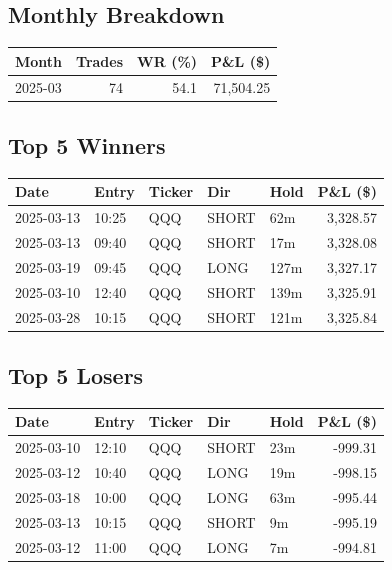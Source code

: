 \documentclass[11pt,a4paper,twoside]{article}
\begin{document}
\subsection{Monthly Breakdown}
\noindent\begin{center}
\begin{tabular}{>{\color{txtmain}}l rrr}
\toprule
\rowcolor{cardbg}
\textbf{Month} & \textbf{Trades} & \textbf{WR (\%)} & \textbf{P\&L (\$)} \\
\midrule
2025-03 & 74 & 54.1 & \textcolor{wingreen}{71,504.25} \\
\bottomrule
\end{tabular}
\end{center}
\subsection{Top 5 Winners}
\noindent\begin{center}
\begin{tabular}{>{\color{txtmain}}l llll r}
\toprule
\rowcolor{cardbg}
\textbf{Date} & \textbf{Entry} & \textbf{Ticker} & \textbf{Dir} & \textbf{Hold} & \textbf{P\&L (\$)} \\
\midrule
2025-03-13 & 10:25 & QQQ & SHORT & 62m & \textcolor{wingreen}{3,328.57} \\
2025-03-13 & 09:40 & QQQ & SHORT & 17m & \textcolor{wingreen}{3,328.08} \\
2025-03-19 & 09:45 & QQQ & LONG & 127m & \textcolor{wingreen}{3,327.17} \\
2025-03-10 & 12:40 & QQQ & SHORT & 139m & \textcolor{wingreen}{3,325.91} \\
2025-03-28 & 10:15 & QQQ & SHORT & 121m & \textcolor{wingreen}{3,325.84} \\
\bottomrule
\end{tabular}
\end{center}
\subsection{Top 5 Losers}
\noindent\begin{center}
\begin{tabular}{>{\color{txtmain}}l llll r}
\toprule
\rowcolor{cardbg}
\textbf{Date} & \textbf{Entry} & \textbf{Ticker} & \textbf{Dir} & \textbf{Hold} & \textbf{P\&L (\$)} \\
\midrule
2025-03-10 & 12:10 & QQQ & SHORT & 23m & \textcolor{lossred}{-999.31} \\
2025-03-12 & 10:40 & QQQ & LONG & 19m & \textcolor{lossred}{-998.15} \\
2025-03-18 & 10:00 & QQQ & LONG & 63m & \textcolor{lossred}{-995.44} \\
2025-03-13 & 10:15 & QQQ & SHORT & 9m & \textcolor{lossred}{-995.19} \\
2025-03-12 & 11:00 & QQQ & LONG & 7m & \textcolor{lossred}{-994.81} \\
\bottomrule
\end{tabular}
\end{center}
\clearpage
\end{document}
